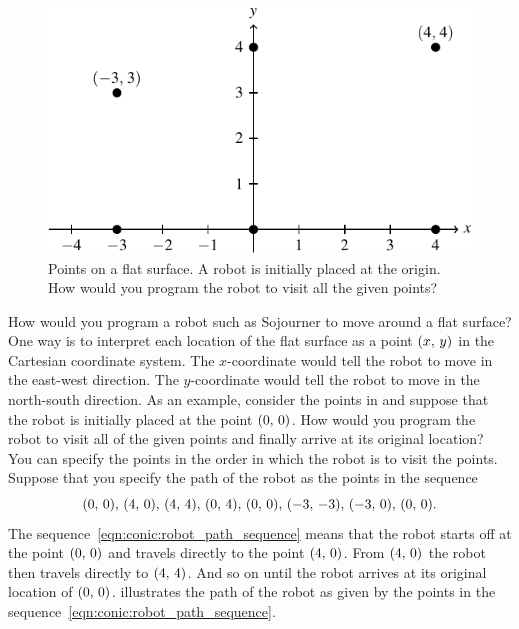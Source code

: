 \documentclass[a4paper,oneside,12pt]{article}
\begin{document}
\begin{figure}[!htbp]
\centering
\includegraphics[scale=1.1]{image/14/robot-path-points.pdf}
\caption{%
  Points on a flat surface.  A robot is initially placed at the
  origin.  How would you program the robot to visit all the given
  points?
}
\label{fig:conic:robot_points}
\end{figure}

How would you program a robot such as Sojourner to move around a flat
surface?  One way is to interpret each location of the flat surface as
a point $\left\lparen{x},\, {y}\right\rparen$ in the Cartesian coordinate system.  The
$x$-coordinate would tell the robot to move in the east-west
direction.  The $y$-coordinate would tell the robot to move in the
north-south direction.  As an example, consider the points in
 and suppose that the robot is
initially placed at the point $\left\lparen{0},\, {0}\right\rparen$.  How would you program
the robot to visit all of the given points and finally arrive at its
original location?  You can specify the points in the order in which
the robot is to visit the points.  Suppose that you specify the path
of the robot as the points in the sequence
\begin{equation}
\label{eqn:conic:robot_path_sequence}
\tuple{0}{0}\comma
\tuple{4}{0}\comma
\tuple{4}{4}\comma
\tuple{0}{4}\comma
\tuple{0}{0}\comma
\tuple{-3}{-3}\comma
\tuple{-3}{0}\comma
\tuple{0}{0}.
\end{equation}
The sequence~\eqref{eqn:conic:robot_path_sequence} means that the
robot starts off at the point $\left\lparen{0},\, {0}\right\rparen$ and travels directly to
the point $\left\lparen{4},\, {0}\right\rparen$.  From $\left\lparen{4},\, {0}\right\rparen$ the robot then travels
directly to $\left\lparen{4},\, {4}\right\rparen$.  And so on until the robot arrives at its
original location of $\left\lparen{0},\, {0}\right\rparen$.
 illustrates the path of
the robot as given by the points in the
sequence~\eqref{eqn:conic:robot_path_sequence}.
\end{document}
